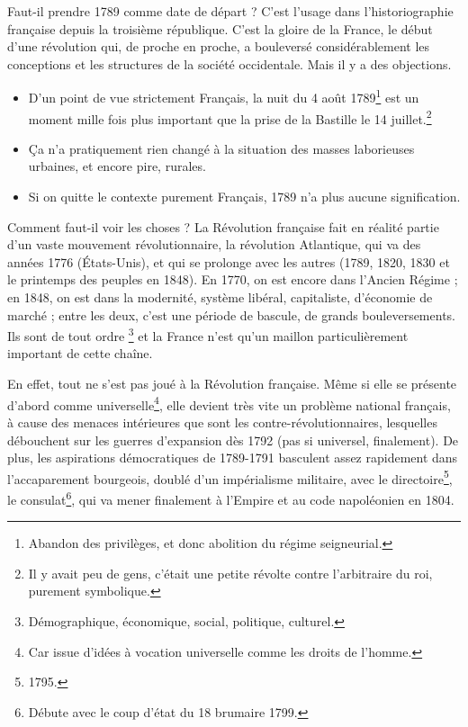 \documentclass[12pt]{report}
\begin{document}
Faut-il prendre 1789 comme date de départ ? C'est l'usage dans l'historiographie française depuis la troisième république. C'est la gloire de la France, le début d'une révolution qui, de proche en proche, a bouleversé considérablement les conceptions et les structures de la société occidentale. Mais il y a des objections. 

\begin{itemize}
	\item D'un point de vue strictement Français, la nuit du 4 août 1789\footnote{Abandon des privilèges, et donc abolition du régime seigneurial.} est un moment mille fois plus important que la prise de la Bastille le 14 juillet.\footnote{Il y avait peu de gens, c'était une petite révolte contre l'arbitraire du roi, purement symbolique.}
	\item Ça n'a pratiquement rien changé à la situation des masses laborieuses urbaines, et encore pire, rurales.
	\item Si on quitte le contexte purement Français, 1789 n'a plus aucune signification.
\end{itemize}

Comment faut-il voir les choses ? La Révolution française fait en réalité partie d'un vaste mouvement révolutionnaire, la révolution Atlantique, qui va des années 1776 (États-Unis), et qui se prolonge avec les autres (1789, 1820, 1830 et le printemps des peuples en 1848). En 1770, on est encore dans l'Ancien Régime ; en 1848, on est dans la modernité, système libéral, capitaliste, d'économie de marché ; entre les deux, c'est une période de bascule, de grands bouleversements. Ils sont de tout ordre \footnote{Démographique, économique, social, politique, culturel.} et la France n'est qu'un maillon particulièrement important de cette chaîne.

En effet, tout ne s'est pas joué à la Révolution française. Même si elle se présente d'abord comme universelle\footnote{Car issue d'idées à vocation universelle comme les droits de l'homme.}, elle devient très vite un problème national français, à cause des menaces intérieures que sont les contre-révolutionnaires, lesquelles débouchent sur les guerres d'expansion dès 1792 (pas si universel, finalement). De plus, les aspirations démocratiques de 1789-1791 basculent assez rapidement dans l'accaparement bourgeois, doublé d'un impérialisme militaire, avec le directoire\footnote{1795.}, le consulat\footnote{Débute avec le coup d'état du 18 brumaire 1799.}, qui va mener finalement à l'Empire et au code napoléonien en 1804.
\end{document}
